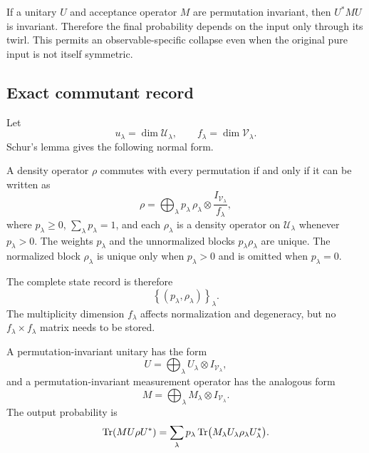 If a unitary $U$ and acceptance operator $M$ are permutation invariant, then $U^*MU$ is invariant. Therefore the final probability depends on the input only through its twirl. This permits an observable-specific collapse even when the original pure input is not itself symmetric.

\subsection{Exact commutant record}
Let
\[
u_\lambda=\dim\mathcal U_\lambda,
\qquad
f_\lambda=\dim\mathcal V_\lambda.
\]
Schur's lemma gives the following normal form.

\begin{lemma}
\label{s:lem:invariant-state-normal-form}
A density operator $\rho$ commutes with every permutation if and only if it can be written as
\begin{equation}
\rho
=
\bigoplus_\lambda
p_\lambda\,\rho_\lambda\otimes
\frac{I_{\mathcal V_\lambda}}{f_\lambda},
\label{s:eq:commutant-state-record}
\end{equation}
where $p_\lambda\ge0$, $\sum_\lambda p_\lambda=1$, and each $\rho_\lambda$ is a density operator on $\mathcal U_\lambda$ whenever $p_\lambda>0$. The weights $p_\lambda$ and the unnormalized blocks $p_\lambda\rho_\lambda$ are unique. The normalized block $\rho_\lambda$ is unique only when $p_\lambda>0$ and is omitted when $p_\lambda=0$.
\end{lemma}

The complete state record is therefore
\[
\left\{
(p_\lambda,\rho_\lambda)
\right\}_\lambda.
\]
The multiplicity dimension $f_\lambda$ affects normalization and degeneracy, but no $f_\lambda\times f_\lambda$ matrix needs to be stored.

A permutation-invariant unitary has the form
\begin{equation}
U
=
\bigoplus_\lambda
U_\lambda\otimes I_{\mathcal V_\lambda},
\label{s:eq:commutant-unitary-form}
\end{equation}
and a permutation-invariant measurement operator has the analogous form
\[
M
=
\bigoplus_\lambda
M_\lambda\otimes I_{\mathcal V_\lambda}.
\]
The output probability is
\begin{equation}
\operatorname{Tr}(MU\rho U^*)
=
\sum_\lambda
p_\lambda
\operatorname{Tr}\bigl(M_\lambda U_\lambda\rho_\lambda U_\lambda^*\bigr).
\label{s:eq:commutant-output}
\end{equation}

